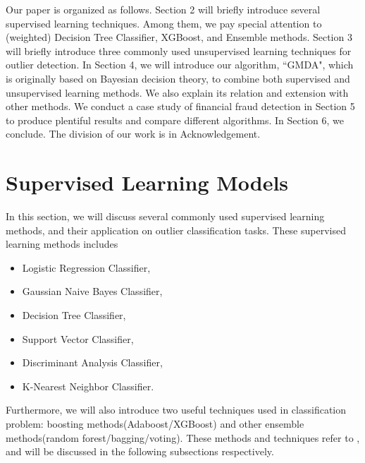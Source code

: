 \documentclass[english]{article}
\begin{document}
\par Our paper is organized as follows. Section 2 will briefly introduce several supervised learning techniques. Among them, we pay special attention to (weighted) Decision Tree Classifier, XGBoost, and Ensemble methods. Section 3 will briefly introduce three commonly used unsupervised learning techniques for outlier detection. In Section 4, we will introduce our algorithm, ``GMDA", which is originally based on Bayesian decision theory, to combine both supervised and unsupervised learning methods. We also explain its relation and extension with other methods. We conduct a case study of financial fraud detection in Section 5 to produce plentiful results and compare different algorithms. In Section 6, we conclude. The division of our work is in Acknowledgement.

\section{Supervised Learning Models}
\par In this section, we will discuss several commonly used supervised learning methods, and their application on outlier classification tasks. These supervised learning methods includes
\begin{itemize}
	\item Logistic Regression Classifier,
	\item Gaussian Naive Bayes Classifier,
	\item Decision Tree Classifier,
	\item Support Vector Classifier,
	\item Discriminant Analysis Classifier,
	\item K-Nearest Neighbor Classifier.
\end{itemize}
\par Furthermore, we will also introduce two useful techniques used in classification problem: boosting methods(Adaboost/XGBoost) and other ensemble methods(random forest/bagging/voting). These methods and techniques refer to \cite{scikit-learn}\cite{friedman2001elements}, and will be discussed in the following subsections respectively.
\end{document}
